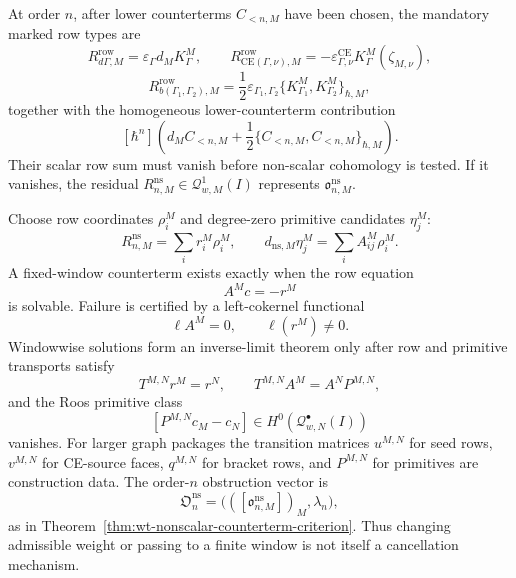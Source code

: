 \begin{enumerate}
  At order \(n\), after lower counterterms \(C_{<n,M}\) have been chosen,
  the mandatory marked row types are
  \[
    R^{\mathrm{row}}_{d\Gamma,M}
      =
    \varepsilon_\Gamma d_MK^M_\Gamma,\qquad
    R^{\mathrm{row}}_{\mathrm{CE}(\Gamma,\nu),M}
      =
    -\varepsilon^{\mathrm{CE}}_{\Gamma,\nu}K^M_\Gamma(\zeta_{M,\nu}),
  \]
  \[
    R^{\mathrm{row}}_{b(\Gamma_1,\Gamma_2),M}
      =
    \frac12\varepsilon_{\Gamma_1,\Gamma_2}
    \{K^M_{\Gamma_1},K^M_{\Gamma_2}\}_{\hbar,M},
  \]
  together with the homogeneous lower-counterterm contribution
  \[
    [\hbar^n]\left(
      d_MC_{<n,M}
      +\frac12\{C_{<n,M},C_{<n,M}\}_{\hbar,M}
    \right).
  \]
  Their scalar row sum must vanish before non-scalar cohomology is
  tested.  If it vanishes, the residual
  \(R^{\mathrm{ns}}_{n,M}\in\mathcal Q^1_{w,M}(I)\) represents
  \(\mathfrak o^{\mathrm{ns}}_{n,M}\).

  Choose row coordinates \(\rho^M_i\) and degree-zero primitive
  candidates \(\eta^M_j\):
  \[
    R^{\mathrm{ns}}_{n,M}=\sum_i r^M_i\rho^M_i,\qquad
    d_{\mathrm{ns},M}\eta^M_j=\sum_iA^M_{ij}\rho^M_i .
  \]
  A fixed-window counterterm exists exactly when the row equation
  \[
    A^Mc=-r^M
  \]
  is solvable.  Failure is certified by a left-cokernel functional
  \[
    \ell A^M=0,\qquad \ell(r^M)\ne0 .
  \]
  Windowwise solutions form an inverse-limit theorem only after row and
  primitive transports satisfy
  \[
    T^{M,N}r^M=r^N,\qquad
    T^{M,N}A^M=A^NP^{M,N},
  \]
  and the Roos primitive class
  \[
    [P^{M,N}c_M-c_N]\in H^0(\mathcal Q^\bullet_{w,N}(I))
  \]
  vanishes.  For larger graph packages the transition matrices
  \(u^{M,N}\) for seed rows, \(v^{M,N}\) for CE-source faces,
  \(q^{M,N}\) for bracket rows, and \(P^{M,N}\) for primitives are
  construction data.  The order-\(n\) obstruction vector is
  \[
    \mathfrak O^{\mathrm{ns}}_n
      =
    \bigl(([\mathfrak o^{\mathrm{ns}}_{n,M}])_M,\lambda_n\bigr),
  \]
  as in Theorem~\ref{thm:wt-nonscalar-counterterm-criterion}.  Thus
  changing admissible weight or passing to a finite window is not itself
  a cancellation mechanism.


\end{enumerate}
